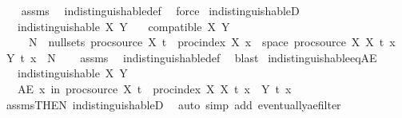 \begin{isabellebody}
%
\isadelimproof
\ \ %
\endisadelimproof
%
\isatagproof
{}\isamarkupfalse%
\ assms\ \isamarkupfalse%
\ indistinguishable{\isacharunderscore}{\kern0pt}def\ \isamarkupfalse%
\ force%
\endisatagproof
{\isafoldproof}%
%
\isadelimproof
\isanewline
%
\endisadelimproof
\isanewline
{}\isamarkupfalse%
\ indistinguishableD{\isacharcolon}{\kern0pt}\isanewline
\ \ \ {\isachardoublequoteopen}indistinguishable\ X\ Y{\isachardoublequoteclose}\isanewline
\ \ \ {\isachardoublequoteopen}compatible\ X\ Y{\isachardoublequoteclose}\isanewline
\ \ \ \ \ {\isachardoublequoteopen}{\isasymexists}N\ {\isasymin}\ null{\isacharunderscore}{\kern0pt}sets\ {\isacharparenleft}{\kern0pt}proc{\isacharunderscore}{\kern0pt}source\ X{\isacharparenright}{\kern0pt}{\isachardot}{\kern0pt}\ {\isacharparenleft}{\kern0pt}{\isasymforall}t\ {\isasymin}\ proc{\isacharunderscore}{\kern0pt}index\ X{\isachardot}{\kern0pt}\ {\isacharbraceleft}{\kern0pt}x\ {\isasymin}\ space\ {\isacharparenleft}{\kern0pt}proc{\isacharunderscore}{\kern0pt}source\ X{\isacharparenright}{\kern0pt}{\isachardot}{\kern0pt}\ X\ t\ x\ {\isasymnoteq}\ Y\ t\ x{\isacharbraceright}{\kern0pt}\ {\isasymsubseteq}\ N{\isacharparenright}{\kern0pt}{\isachardoublequoteclose}\isanewline
%
\isadelimproof
\ \ %
\endisadelimproof
%
\isatagproof
{}\isamarkupfalse%
\ assms\ \isamarkupfalse%
\ indistinguishable{\isacharunderscore}{\kern0pt}def\ \isamarkupfalse%
\ blast{\isacharplus}{\kern0pt}%
\endisatagproof
{\isafoldproof}%
%
\isadelimproof
\isanewline
%
\endisadelimproof
\isanewline
{}\isamarkupfalse%
\ indistinguishable{\isacharunderscore}{\kern0pt}eq{\isacharunderscore}{\kern0pt}AE{\isacharcolon}{\kern0pt}\isanewline
\ \ \ {\isachardoublequoteopen}indistinguishable\ X\ Y{\isachardoublequoteclose}\isanewline
\ \ \ {\isachardoublequoteopen}AE\ x\ in\ proc{\isacharunderscore}{\kern0pt}source\ X{\isachardot}{\kern0pt}\ {\isasymforall}t\ {\isasymin}\ proc{\isacharunderscore}{\kern0pt}index\ X{\isachardot}{\kern0pt}\ X\ t\ x\ {\isacharequal}{\kern0pt}\ Y\ t\ x{\isachardoublequoteclose}\isanewline
%
\isadelimproof
\ \ %
\endisadelimproof
%
\isatagproof
{}\isamarkupfalse%
\ assms{\isacharbrackleft}{\kern0pt}THEN\ indistinguishableD{\isacharparenleft}{\kern0pt}{}{\isacharparenright}{\kern0pt}{\isacharbrackright}{\kern0pt}\ \isamarkupfalse%
\ {\isacharparenleft}{\kern0pt}auto\ simp\ add{\isacharcolon}{\kern0pt}\ eventually{\isacharunderscore}{\kern0pt}ae{\isacharunderscore}{\kern0pt}filter{\isacharparenright}{\kern0pt}%

\end{isabellebody}
